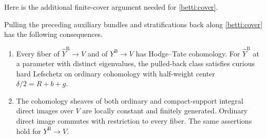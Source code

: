 Here is the additional finite-cover argument needed for
\eqref{betti:cover}.

\begin{lemma}\label{betti:finite-cover}
Pulling the preceding auxiliary bundles and stratifications back along
\eqref{betti:cover} has the following consequences.
\begin{enumerate}
\item Every fiber of $\widehat Y^{\mathrm B}\to V$ and of
$Y^{\mathrm B}\to V$ has Hodge--Tate cohomology.  For
$\widehat Y^{\mathrm B}$ at a parameter with distinct eigenvalues, the pulled-back
class satisfies curious hard Lefschetz on ordinary cohomology with
half-weight center $\delta/2=R+b+g$.
\item The cohomology sheaves of both ordinary and compact-support
integral direct images over $V$ are locally constant and finitely
generated.  Ordinary direct image commutes with restriction to every
fiber.  The same assertions hold for $Y^{\mathrm B}\to V$.
\end{enumerate}
\end{lemma}

